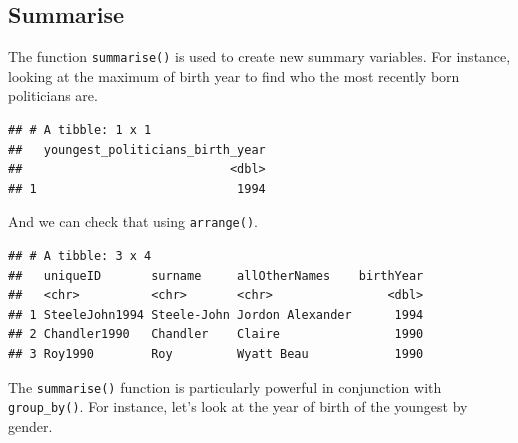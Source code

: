 \documentclass[
]{book}
\newenvironment{Shaded}{\begin{snugshade}}{\end{snugshade}}
\newcommand{\DataTypeTok}[1]{\textcolor[rgb]{0.13,0.29,0.53}{#1}}
\newcommand{\DecValTok}[1]{\textcolor[rgb]{0.00,0.00,0.81}{#1}}
\newcommand{\KeywordTok}[1]{\textcolor[rgb]{0.13,0.29,0.53}{\textbf{#1}}}
\newcommand{\NormalTok}[1]{#1}
\newcommand{\OperatorTok}[1]{\textcolor[rgb]{0.81,0.36,0.00}{\textbf{#1}}}
\newcommand{\OtherTok}[1]{\textcolor[rgb]{0.56,0.35,0.01}{#1}}
\newcommand{\StringTok}[1]{\textcolor[rgb]{0.31,0.60,0.02}{#1}}
\begin{document}
\hypertarget{summarise}{%
\subsection{Summarise}\label{summarise}}

The function \texttt{summarise()} is used to create new summary variables. For instance, looking at the maximum of birth year to find who the most recently born politicians are.

\begin{Shaded}
\end{Shaded}

\begin{verbatim}
## # A tibble: 1 x 1
##   youngest_politicians_birth_year
##                             <dbl>
## 1                            1994
\end{verbatim}

And we can check that using \texttt{arrange()}.

\begin{Shaded}
\end{Shaded}

\begin{verbatim}
## # A tibble: 3 x 4
##   uniqueID       surname     allOtherNames    birthYear
##   <chr>          <chr>       <chr>                <dbl>
## 1 SteeleJohn1994 Steele-John Jordon Alexander      1994
## 2 Chandler1990   Chandler    Claire                1990
## 3 Roy1990        Roy         Wyatt Beau            1990
\end{verbatim}

The \texttt{summarise()} function is particularly powerful in conjunction with \texttt{group\_by()}. For instance, let's look at the year of birth of the youngest by gender.
\end{document}

